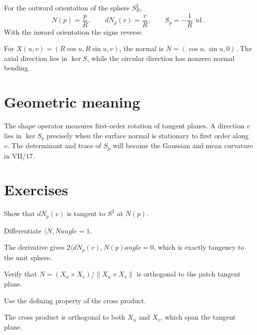 \begin{example}[Sphere]\label{ex:vii16-sphere}
For the outward orientation of the sphere \(S_R^2\),
\[
N(p)=\frac{p}{R},\qquad dN_p(v)=\frac{v}{R},
\qquad S_p=-\frac1R\,\operatorname{id}.
\]
With the inward orientation the signs reverse.
\end{example}

\begin{example}[Cylinder]\label{ex:vii16-cylinder}
For \(X(u,v)=(R\cos u,R\sin u,v)\), the normal is
\(N=(\cos u,\sin u,0)\). The axial direction lies in \(\ker S\), while the circular direction has nonzero normal bending.
\end{example}

\section{Geometric meaning}

The shape operator measures first-order rotation of tangent planes. A direction \(v\) lies in \(\ker S_p\) precisely when the surface normal is stationary to first order along \(v\). The determinant and trace of \(S_p\) will become the Gaussian and mean curvature in VII/17.

\section{Exercises}
\begin{exercise}\label{exr:vii16-01}
Show that \(dN_p(v)\) is tangent to \(S^2\) at \(N(p)\).
\end{exercise}
\begin{hint}
Differentiate \(\langle N,N
angle=1\).
\end{hint}
\begin{solution}
The derivative gives \(2\langle dN_p(v),N(p)
angle=0\), which is exactly tangency to the unit sphere.
\end{solution}

\begin{exercise}\label{exr:vii16-02}
Verify that \(N=(X_u\times X_v)/\|X_u\times X_v\|\) is orthogonal to the patch tangent plane.
\end{exercise}
\begin{hint}
Use the defining property of the cross product.
\end{hint}
\begin{solution}
The cross product is orthogonal to both \(X_u\) and \(X_v\), which span the tangent plane.
\end{solution}

